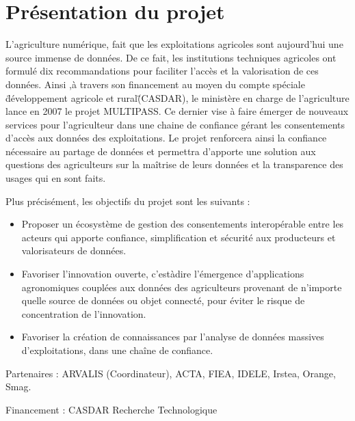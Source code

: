 \section{Présentation du projet} 
L'agriculture numérique, fait que les exploitations agricoles sont aujourd’hui une source immense de données. De ce fait, les institutions techniques agricoles ont formulé dix recommandations pour faciliter l’accès  et la valorisation de ces données. Ainsi ,à travers son financement au moyen du compte spéciale \"développement agricole et rural\" (CASDAR), le ministère en charge de l’agriculture lance en 2007 le projet  MULTIPASS. Ce dernier vise à faire émerger de nouveaux services pour l’agriculteur dans une chaine de confiance gérant les consentements d’accès aux données des exploitations. Le projet renforcera ainsi la confiance nécessaire au partage de données et permettra d’apporte une solution aux questions des agriculteurs sur la maîtrise de leurs données et la transparence des usages qui en sont faits. 

Plus précisément, les objectifs du projet sont les suivants : 

\begin{itemize}
    \item Proposer un écosystème de gestion des consentements interopérable entre les acteurs qui apporte confiance, simplification et sécurité aux producteurs et valorisateurs de données. 
    \item Favoriser l’innovation ouverte, c’est\-à\-dire l’émergence d’applications agronomiques couplées aux données des agriculteurs provenant de n’importe quelle source de données ou objet connecté, pour éviter le risque de concentration de l’innovation. 
    \item Favoriser la création de connaissances par l’analyse de données massives d’exploitations, dans une chaîne de confiance. 
\end{itemize}

Partenaires : ARVALIS (Coordinateur), ACTA, FIEA, IDELE, Irstea, Orange, Smag.

Financement : \gls{CASDAR} Recherche Technologique 